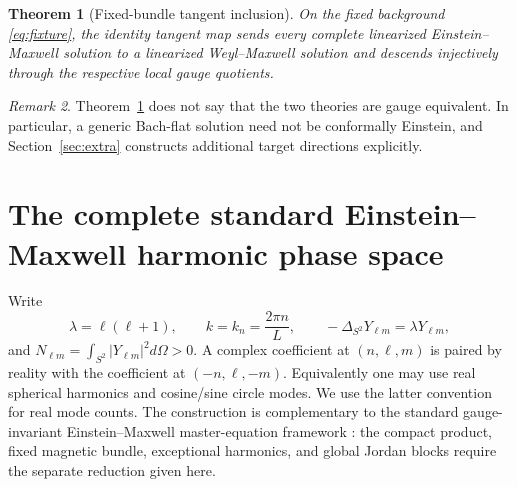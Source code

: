 \documentclass[11pt]{article}
\newtheorem{theorem}{Theorem}[section]
\theoremstyle{remark}
\newtheorem{remark}[theorem]{Remark}
\begin{document}
\begin{theorem}[Fixed-bundle tangent inclusion]\label{thm:inclusion}
On the fixed background \eqref{eq:fixture}, the identity tangent map sends
every complete linearized Einstein--Maxwell solution to a linearized
Weyl--Maxwell solution and descends injectively through the respective local
gauge quotients.
\end{theorem}

\begin{remark}
Theorem~\ref{thm:inclusion} does not say that the two theories are gauge
equivalent. In particular, a generic Bach-flat solution need not be
conformally Einstein, and Section~\ref{sec:extra} constructs additional
target directions explicitly.
\end{remark}

\section{The complete standard Einstein--Maxwell harmonic phase space}
\label{sec:source}

Write
\begin{equation}
 \lambda=\ell(\ell+1),\qquad k=k_n=\frac{2\pi n}{L},
 \qquad -\Delta_{S^2}Y_{\ell m}=\lambda Y_{\ell m},
\end{equation}
and $N_{\ell m}=\int_{S^2}|Y_{\ell m}|^2d\Omega>0$. A complex coefficient at
$(n,\ell,m)$ is paired by reality with the coefficient at $(-n,\ell,-m)$.
Equivalently one may use real spherical harmonics and cosine/sine circle
modes. We use the latter convention for real mode counts. The construction
is complementary to the standard gauge-invariant Einstein--Maxwell
master-equation framework \cite{KodamaIshibashi}: the compact product, fixed
magnetic bundle, exceptional harmonics, and global Jordan blocks require the
separate reduction given here.
\end{document}
